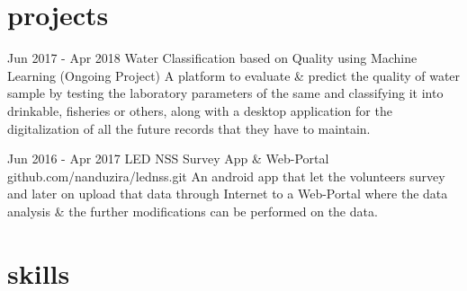 \documentclass[]{friggeri-cv}
\begin{document}
\section{projects}
\begin{entrylist}
	
	\entry
	{Jun 2017 - Apr 2018}
	{Water Classification based on Quality using Machine Learning {\normalfont }}
	{(Ongoing Project)}
	{A platform to evaluate \& predict the quality of water sample by testing the laboratory parameters of the same and classifying it into drinkable, fisheries or others, along with a desktop application for the digitalization of all the future records that they have to maintain.}
	
	
	\entry
	{Jun 2016 - Apr 2017}
	{LED NSS Survey App \& Web-Portal}
	{github.com/nanduzira/lednss.git }
	{An android app that let the volunteers survey and later on upload that data through Internet to a Web-Portal where the data analysis \& the further modifications can be performed on the data.}
	
\end{entrylist}
\newline

\section{skills}
\begin{entrylist}
\end{entrylist}
\newpage
\end{document}

